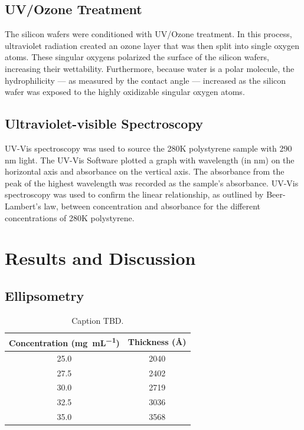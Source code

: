 \documentclass[twocolumn]{article}
\begin{document}
            \subsection{UV/Ozone Treatment}
                The silicon wafers were conditioned with UV/Ozone treatment. In this process, ultraviolet radiation created an ozone layer that was then split into single oxygen atoms. These singular oxygens polarized the surface of the silicon wafers, increasing their wettability. Furthermore, because water is a polar molecule, the hydrophilicity --- as measured by the contact angle --- increased as the silicon wafer was exposed to the highly oxidizable singular oxygen atoms. 

            \subsection{Ultraviolet-visible Spectroscopy}
                UV-Vis spectroscopy was used to source the 280K polystyrene sample with 290 nm light. The UV-Vis Software plotted a graph with wavelength (in nm) on the horizontal axis and absorbance on the vertical axis. The absorbance from the peak of the highest wavelength was recorded as the sample's absorbance. UV-Vis spectroscopy was used to confirm the linear relationship, as outlined by Beer-Lambert's law, between concentration and absorbance for the different concentrations of 280K polystyrene.

        \section{Results and Discussion}
            \subsection{Ellipsometry}

                \begin{table}
                    \centering
                        \begin{tabular}{@{}cc@{}}
                            \toprule
                            Concentration (\unit{\milli\gram\per\milli\liter}) & Thickness (\unit{\angstrom}) \\ \midrule
                            25.0                  & 2040          \\
                            27.5                  & 2402          \\
                            30.0                  & 2719          \\
                            32.5                  & 3036          \\
                            35.0                  & 3568          \\ \bottomrule
                        \end{tabular}
                        \caption{Caption TBD.}\label{tab:ellips}
                \end{table}
\end{document}
